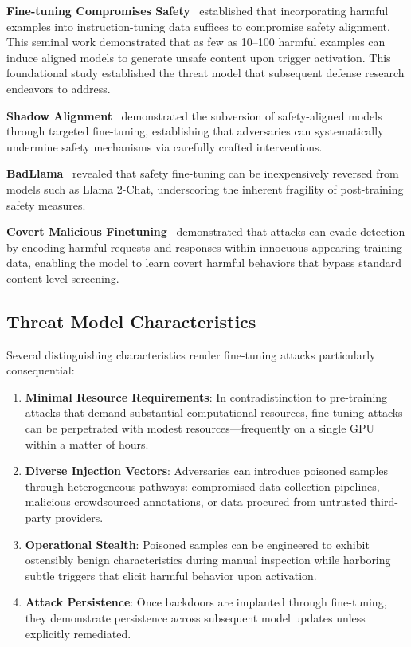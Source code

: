 \textbf{Fine-tuning Compromises Safety}~\cite{qi2023fine} established that incorporating harmful examples into instruction-tuning data suffices to compromise safety alignment. This seminal work demonstrated that as few as 10--100 harmful examples can induce aligned models to generate unsafe content upon trigger activation. This foundational study established the threat model that subsequent defense research endeavors to address.

\textbf{Shadow Alignment}~\cite{yang2023shadow} demonstrated the subversion of safety-aligned models through targeted fine-tuning, establishing that adversaries can systematically undermine safety mechanisms via carefully crafted interventions.

\textbf{BadLlama}~\cite{gade2023badllama} revealed that safety fine-tuning can be inexpensively reversed from models such as Llama 2-Chat, underscoring the inherent fragility of post-training safety measures.

\textbf{Covert Malicious Finetuning}~\cite{halawi2024covert} demonstrated that attacks can evade detection by encoding harmful requests and responses within innocuous-appearing training data, enabling the model to learn covert harmful behaviors that bypass standard content-level screening.

\subsection*{Threat Model Characteristics}
Several distinguishing characteristics render fine-tuning attacks particularly consequential:

\begin{enumerate}
    \item \textbf{Minimal Resource Requirements}: In contradistinction to pre-training attacks that demand substantial computational resources, fine-tuning attacks can be perpetrated with modest resources---frequently on a single GPU within a matter of hours.

    \item \textbf{Diverse Injection Vectors}: Adversaries can introduce poisoned samples through heterogeneous pathways: compromised data collection pipelines, malicious crowdsourced annotations, or data procured from untrusted third-party providers.

    \item \textbf{Operational Stealth}: Poisoned samples can be engineered to exhibit ostensibly benign characteristics during manual inspection while harboring subtle triggers that elicit harmful behavior upon activation.

    \item \textbf{Attack Persistence}: Once backdoors are implanted through fine-tuning, they demonstrate persistence across subsequent model updates unless explicitly remediated.
\end{enumerate}


